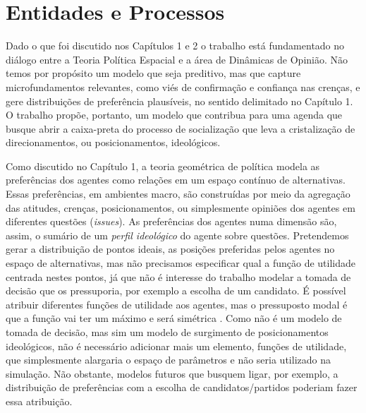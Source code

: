 \section{Entidades e Processos}

Dado o que foi discutido nos Capítulos 1 e 2 o trabalho está fundamentado no
diálogo entre a Teoria Política Espacial e a área de Dinâmicas de Opinião. Não
temos por propósito um modelo que seja preditivo, mas que capture
microfundamentos relevantes, como viés de confirmação e confiança nas crenças, e
gere distribuições de preferência plausíveis, no sentido delimitado no Capítulo
1. O trabalho propõe, portanto, um modelo que contribua para uma agenda que
busque abrir a caixa-preta do processo de socialização que leva a cristalização
de direcionamentos, ou posicionamentos, ideológicos.

Como discutido no Capítulo 1, a teoria geométrica de política modela as
preferências dos agentes como relações em um espaço contínuo de alternativas.
Essas preferências, em ambientes macro, são construídas por meio da agregação
das atitudes, crenças, posicionamentos, ou simplesmente opiniões dos agentes em
diferentes questões (\textit{issues}). As preferências dos agentes numa dimensão
são, assim, o sumário de um \textit{perfil ideológico} do agente sobre questões.
Pretendemos gerar a distribuição de pontos ideais, as posições preferidas pelos
agentes no espaço de alternativas, mas não precisamos especificar qual a função
de utilidade centrada nestes pontos, já que não é interesse do trabalho modelar
a tomada de decisão que os pressuporia, por exemplo a escolha de um candidato. É
possível atribuir diferentes funções de utilidade aos agentes, mas o pressuposto
modal é que a função vai ter um máximo e será simétrica \cite{eguia2013spatial,
  carroll2013structure}. Como não é um modelo de tomada de decisão, mas sim um
modelo de surgimento de posicionamentos ideológicos, não é necessário adicionar
mais um elemento, funções de utilidade, que simplesmente alargaria o espaço de
parâmetros e não seria utilizado na simulação. Não obstante, modelos futuros que
busquem ligar, por exemplo, a distribuição de preferências com a escolha de
candidatos/partidos poderiam fazer essa atribuição.


